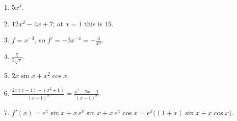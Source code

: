 \begin{enumerate}[label=\textbf{\ansnum.\arabic*}]
  \item $5x^4$.
  \item $12x^2-4x+7$; at $x=1$ this is $15$.
  \item $f=x^{-3}$, so $f'=-3x^{-4}=-\frac{3}{x^4}$.
  \item $\frac{5}{2\sqrt x}$.
  \item $2x\sin x+x^2\cos x$.
  \item $\frac{2x(x-1)-(x^2+1)}{(x-1)^2}=\frac{x^2-2x-1}{(x-1)^2}$.
  \item[\textbf{\ansnum.7}] $f'(x)=e^x\sin x+x\,e^x\sin x+x\,e^x\cos x=e^x\bigl((1+x)\sin x+x\cos x\bigr)$.
\end{enumerate}
